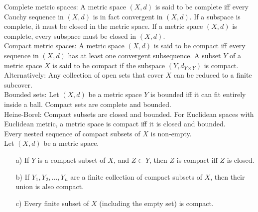 \documentclass[10pt]{article}
\begin{document}
\begin{small}
    Complete metric spaces: A metric space $(X,d)$ is said to be complete iff every Cauchy sequence in $(X,d)$ is in fact convergent in $(X,d)$. If a subspace is complete, it must be closed in the metric space. If a metric space $(X,d)$ is complete, every subspace must be closed in $(X,d)$.\\

    Compact metric spaces: A metric space $(X,d)$ is said to be compact iff every sequence in $(X, d)$ has at least one convergent subsequence. A subset $Y$ of a metric space $X$ is said to be compact if the subspace $(Y, d_{Y\times Y})$ is compact.\\
    Alternatively: Any collection of open sets that cover $X$ can be reduced to a finite subcover.\\

    Bounded sets: Let $(X, d)$ be a metric space $Y$ is bounded iff it can fit entirely inside a ball. Compact sets are complete and bounded.\\

    Heine-Borel: Compact subsets are closed and bounded. For Euclidean spaces with Euclidean metric, a metric space is compact iff it is closed and bounded.\\

    Every nested sequence of compact subsets of $X$ is non-empty.\\

    Let $(X,d)$ be a metric space.
    \begin{itemize}
        \item [a)] If $Y$ is a compact subset of $X$, and $Z\subset Y$, then $Z$ is compact iff $Z$ is closed.
        \item [b)] If $Y_1, Y_2,...,Y_n$ are a finite collection of compact subsets of $X$, then their union is also compact.
        \item [c)] Every finite subset of $X$ (including the empty set) is compact.
    \end{itemize}


\end{small}
\end{document}
